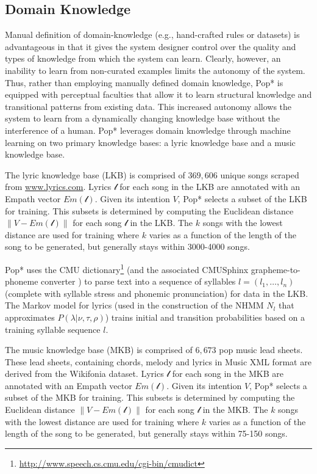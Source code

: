 \documentclass[phd,electronic,oneside,twosidetoc,letterpaper,chaptercenter,parttop,lol,lof,lot]{byumsphd}
\begin{document}
\subsection{Domain Knowledge}

Manual definition of domain-knowledge (e.g., hand-crafted rules or datasets) is advantageous in that it gives the system designer control over the quality and types of knowledge from which the system can learn. Clearly, however, an inability to learn from non-curated examples limits the autonomy of the system. Thus, rather than employing manually defined domain knowledge, Pop* is equipped with perceptual faculties that allow it to learn structural knowledge and transitional patterns from existing data. This increased autonomy allows the system to learn from a dynamically changing knowledge base without the interference of a human. Pop* leverages domain knowledge through machine learning on two primary knowledge bases: a lyric knowledge base and a music knowledge base.

The lyric knowledge base (LKB) is comprised of $369,606$ unique songs scraped from \url{www.lyrics.com}. Lyrics $\mathcal{l}$ for each song in the LKB are annotated with an Empath vector $Em(\mathcal{l})$. Given its intention $V$, Pop* selects a subset of the LKB for training. This subsets is determined by computing the Euclidean distance $\lVert V - Em(\mathcal{l})\rVert$ for each song $\mathcal{l}$ in the LKB. The $k$ songs with the lowest distance are used for training where $k$ varies as a function of the length of the song to be generated, but generally stays within 3000-4000 songs.

Pop* uses the CMU dictionary\footnote{\url{http://www.speech.cs.cmu.edu/cgi-bin/cmudict}} (and the associated CMUSphinx grapheme-to-phoneme converter \citep{Walker2004}) to parse text into a sequence of syllables $l=(l_1,\dots,l_n)$ (complete with syllable stress and phonemic pronunciation) for data in the LKB. The Markov model for lyrics (used in the construction of the NHMM $N_l$ that approximates $P(\lambda|\nu,\tau,\rho)$) trains initial and transition probabilities based on a training syllable sequence $l$.

The music knowledge base (MKB) is comprised of $6,673$ pop music lead sheets. These lead sheets, containing chords, melody and lyrics in Music XML format are derived from the Wikifonia dataset. Lyrics $\mathcal{l}$ for each song in the MKB are annotated with an Empath vector $Em(\mathcal{l})$. Given its intention $V$, Pop* selects a subset of the MKB for training. This subsets is determined by computing the Euclidean distance $\lVert V - Em(\mathcal{l})\rVert$ for each song $\mathcal{l}$ in the MKB. The $k$ songs with the lowest distance are used for training where $k$ varies as a function of the length of the song to be generated, but generally stays within 75-150 songs.
\end{document}
